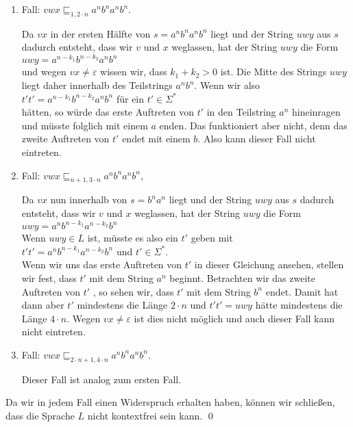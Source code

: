 \begin{enumerate}
\item Fall: \quad $vwx \sqsubseteq_{1,2\cdot n} a^{n}b^{n}a^{n}b^{n}$.

      Da $vx$ in der ersten H\"alfte von
      $s = a^{n}b^{n}a^{n}b^{n}$ liegt und der String $uwy$ aus $s$ dadurch entsteht, dass
      wir $v$ und $x$ weglassen, hat der String $uwy$ die Form
      \\[0.2cm]
      \hspace*{1.3cm}
      $uwy = a^{n-k_1}b^{n-k_2}a^{n}b^{n}$
      \\[0.2cm]
      und wegen $vx \not= \varepsilon$ wissen wir, dass $k_1 + k_2 > 0$ ist.
      Die Mitte des Strings $uwy$ liegt daher innerhalb des Teilstrings $a^nb^n$.
      Wenn wir also 
      \\[0.2cm]
      \hspace*{1.3cm}
      $t't' = a^{n-k_1}b^{n-k_2}a^{n}b^{n}$ \quad f\"ur ein $t' \in \Sigma^*$
      \\[0.2cm]
      h\"atten, so w\"urde das erste Auftreten von $t'$ in den Teilstring $a^{n}$ hineinragen und m\"usste folglich
      mit einem $a$ enden.  Das funktioniert aber nicht, denn
      das zweite Auftreten von $t'$ endet mit einem $b$.  Also kann dieser Fall nicht eintreten.
\item Fall: \quad $vwx \sqsubseteq_{n+1,3\cdot n} a^{n}b^{n}a^{n}b^{n}$,  

      Da $vx$ nun innerhalb von $s = b^{n}a^{n}$ liegt und der String $uwy$ aus $s$ dadurch
      entsteht, dass wir $v$ und $x$ weglassen, hat der String $uwy$ die Form
      \\[0.2cm]
      \hspace*{1.3cm} $uwy = a^{n}b^{n-k_1}a^{n-k_2}b^{n}$
      \\[0.2cm]
      Wenn $uwy \in L$ ist, m\"usste es also ein $t'$ geben mit
      \\[0.2cm]
      \hspace*{1.3cm} $t't' = a^{n}b^{n-k_1}a^{n-k_2}b^{n}$ \quad und $t' \in \Sigma^*$.
      \\[0.2cm]
      Wenn wir uns das erste Auftreten von $t'$ in dieser Gleichung ansehen, stellen wir fest, dass $t'$ mit
      dem String $a^{n}$ beginnt.  Betrachten wir das zweite Auftreten von $t'$      , so sehen wir, dass 
      $t'$ mit dem String $b^{n}$ endet.  Damit hat dann aber $t'$ mindestens die L\"ange $2
  \cdot n$ und $t't' = uwy$ 
      h\"atte mindestens die L\"ange $4 \cdot n$.  Wegen $vx \not= \varepsilon$  ist dies
      nicht m\"oglich und auch dieser Fall kann nicht eintreten.  

\item Fall: \quad $vwx \sqsubseteq_{2\cdot n+1, 4 \cdot n} a^{n}b^{n}a^{n}b^{n}$.
  
      Dieser Fall ist analog zum ersten Fall.
\end{enumerate}
Da wir in jedem Fall einen Widerspruch erhalten haben, k\"onnen wir schlie{\ss}en, dass die Sprache $L$
nicht kontextfrei sein kann.
\qed

